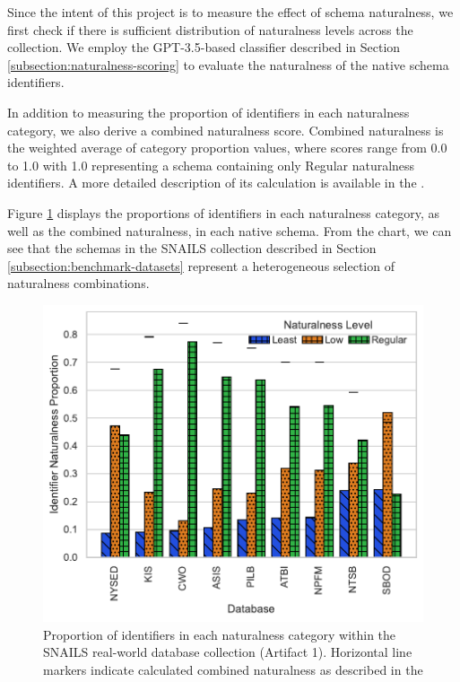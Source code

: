Since the intent of this project is to measure the effect of schema naturalness, we first check if there is sufficient distribution of naturalness levels across the collection. 
We employ the GPT-3.5-based classifier described in Section \ref{subsection:naturalness-scoring} to evaluate the naturalness of the native schema identifiers.

In addition to measuring the proportion of identifiers in each naturalness category, we also derive a combined naturalness score.
Combined naturalness is the weighted average of category proportion values, where scores range from 0.0 to 1.0 with 1.0 representing a schema containing only Regular naturalness identifiers.
A more detailed description of its calculation is available in the \fi.

Figure \ref{fig:databasenaturalness} displays the proportions of identifiers in each naturalness category, as well as the combined naturalness, in each native schema.
From the chart, we can see that the schemas in the SNAILS collection described in Section \ref{subsection:benchmark-datasets} represent a heterogeneous selection of naturalness combinations.

\begin{figure}
  \centering
  \includegraphics[width=\figwidthmod\linewidth]{figures/naturalness_by_db.pdf}
  \caption{Proportion of identifiers in each naturalness category within the SNAILS real-world database collection (Artifact 1). Horizontal line markers indicate calculated combined naturalness as described in the \fi}
  \label{fig:databasenaturalness}
\end{figure}


